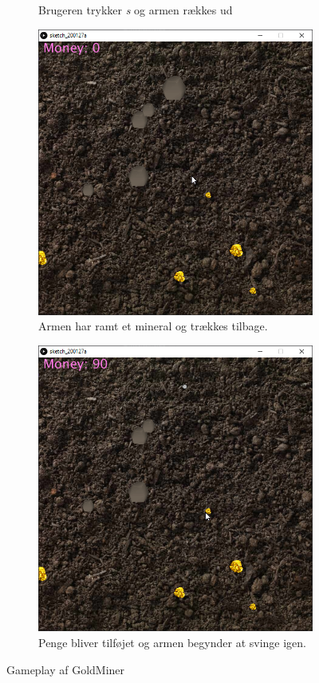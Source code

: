 \documentclass[12pt,a4paper]{article}
\begin{document}
\begin{figure}[H]
\begin{subfigure}{.5\textwidth}
            \caption{Brugeren trykker \emph{s} og armen rækkes ud}
        \end{subfigure}
        \begin{subfigure}{.5\textwidth}
            \centering
            \includegraphics[width=.98\linewidth]{3.png}
            \caption{Armen har ramt et mineral og trækkes tilbage.}
        \end{subfigure}
        \begin{subfigure}{.5\textwidth}
            \centering
            \includegraphics[width=.98\linewidth]{4.png}
            \caption{Penge bliver tilføjet og armen begynder at svinge igen.}
        \end{subfigure}
        \caption{Gameplay af GoldMiner}
    \end{figure}
\end{document}
